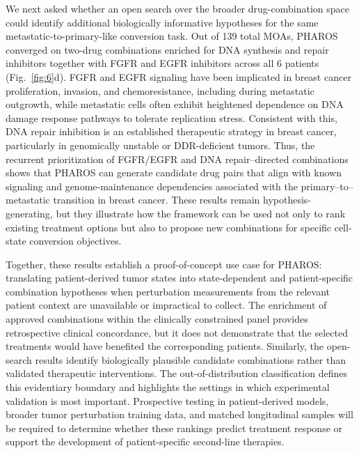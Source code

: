\documentclass[11pt,a4paper]{article}
\begin{document}
We next asked whether an open search over the broader drug-combination space could identify additional biologically informative hypotheses for the same metastatic-to-primary-like conversion task. Out of 139 total MOAs, PHAROS converged on two-drug combinations enriched for DNA synthesis and repair inhibitors together with FGFR and EGFR inhibitors across all 6 patients (Fig.~\ref{fig:6}d). FGFR and EGFR signaling have been implicated in breast cancer proliferation, invasion, and chemoresistance, including during metastatic outgrowth, while metastatic cells often exhibit heightened dependence on DNA damage response pathways to tolerate replication stress\cite{Servetto2021, Zhang2022, Ali2017, Popawski2010, Santolla2020, Min2021, SR2016}. Consistent with this, DNA repair inhibition is an established therapeutic strategy in breast cancer, particularly in genomically unstable or DDR-deficient tumors\cite{Qu2023, Li2024}. Thus, the recurrent prioritization of FGFR/EGFR and DNA repair–directed combinations shows that PHAROS can generate candidate drug pairs that align with known signaling and genome-maintenance dependencies associated with the primary–to–metastatic transition in breast cancer. These results remain hypothesis-generating, but they illustrate how the framework can be used not only to rank existing treatment options but also to propose new combinations for specific cell-state conversion objectives.

Together, these results establish a proof-of-concept use case for PHAROS: translating patient-derived tumor states into state-dependent and patient-specific combination hypotheses when perturbation measurements from the relevant patient context are unavailable or impractical to collect. The enrichment of approved combinations within the clinically constrained panel provides retrospective clinical concordance, but it does not demonstrate that the selected treatments would have benefited the corresponding patients. Similarly, the open-search results identify biologically plausible candidate combinations rather than validated therapeutic interventions. The out-of-distribution classification defines this evidentiary boundary and highlights the settings in which experimental validation is most important. Prospective testing in patient-derived models, broader tumor perturbation training data, and matched longitudinal samples will be required to determine whether these rankings predict treatment response or support the development of patient-specific second-line therapies.
\end{document}
